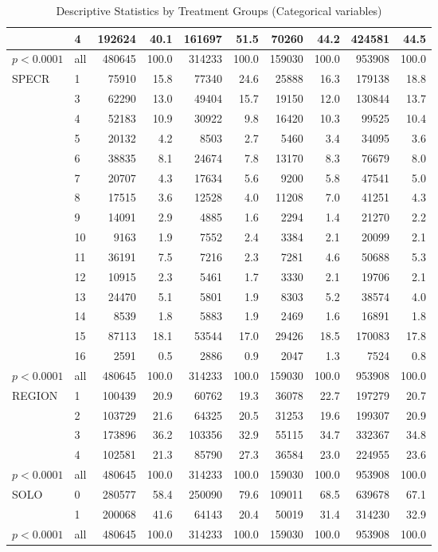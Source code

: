 \begin{table}[ht]
{\begin{tabular}{ll|rr|rr|rr|rr}
   & 4 & 192624 & 40.1 & 161697 & 51.5 & 70260 & 44.2 & 424581 & 44.5 \\ 
   \hline
$p< 0.0001$ & all & 480645 & 100.0 & 314233 & 100.0 & 159030 & 100.0 & 953908 & 100.0 \\ 
   \hline
\hline
SPECR & 1 & 75910 & 15.8 & 77340 & 24.6 & 25888 & 16.3 & 179138 & 18.8 \\ 
   & 3 & 62290 & 13.0 & 49404 & 15.7 & 19150 & 12.0 & 130844 & 13.7 \\ 
   & 4 & 52183 & 10.9 & 30922 & 9.8 & 16420 & 10.3 & 99525 & 10.4 \\ 
   & 5 & 20132 & 4.2 & 8503 & 2.7 & 5460 & 3.4 & 34095 & 3.6 \\ 
   & 6 & 38835 & 8.1 & 24674 & 7.8 & 13170 & 8.3 & 76679 & 8.0 \\ 
   & 7 & 20707 & 4.3 & 17634 & 5.6 & 9200 & 5.8 & 47541 & 5.0 \\ 
   & 8 & 17515 & 3.6 & 12528 & 4.0 & 11208 & 7.0 & 41251 & 4.3 \\ 
   & 9 & 14091 & 2.9 & 4885 & 1.6 & 2294 & 1.4 & 21270 & 2.2 \\ 
   & 10 & 9163 & 1.9 & 7552 & 2.4 & 3384 & 2.1 & 20099 & 2.1 \\ 
   & 11 & 36191 & 7.5 & 7216 & 2.3 & 7281 & 4.6 & 50688 & 5.3 \\ 
   & 12 & 10915 & 2.3 & 5461 & 1.7 & 3330 & 2.1 & 19706 & 2.1 \\ 
   & 13 & 24470 & 5.1 & 5801 & 1.9 & 8303 & 5.2 & 38574 & 4.0 \\ 
   & 14 & 8539 & 1.8 & 5883 & 1.9 & 2469 & 1.6 & 16891 & 1.8 \\ 
   & 15 & 87113 & 18.1 & 53544 & 17.0 & 29426 & 18.5 & 170083 & 17.8 \\ 
   & 16 & 2591 & 0.5 & 2886 & 0.9 & 2047 & 1.3 & 7524 & 0.8 \\ 
   \hline
$p< 0.0001$ & all & 480645 & 100.0 & 314233 & 100.0 & 159030 & 100.0 & 953908 & 100.0 \\ 
   \hline
\hline
REGION & 1 & 100439 & 20.9 & 60762 & 19.3 & 36078 & 22.7 & 197279 & 20.7 \\ 
   & 2 & 103729 & 21.6 & 64325 & 20.5 & 31253 & 19.6 & 199307 & 20.9 \\ 
   & 3 & 173896 & 36.2 & 103356 & 32.9 & 55115 & 34.7 & 332367 & 34.8 \\ 
   & 4 & 102581 & 21.3 & 85790 & 27.3 & 36584 & 23.0 & 224955 & 23.6 \\ 
   \hline
$p< 0.0001$ & all & 480645 & 100.0 & 314233 & 100.0 & 159030 & 100.0 & 953908 & 100.0 \\ 
   \hline
\hline
SOLO & 0 & 280577 & 58.4 & 250090 & 79.6 & 109011 & 68.5 & 639678 & 67.1 \\ 
   & 1 & 200068 & 41.6 & 64143 & 20.4 & 50019 & 31.4 & 314230 & 32.9 \\ 
   \hline
$p< 0.0001$ & all & 480645 & 100.0 & 314233 & 100.0 & 159030 & 100.0 & 953908 & 100.0 \\ 
   \hline
\hline
\end{tabular}
}
\caption{Descriptive Statistics by Treatment Groups (Categorical variables)} 
\label{tab:descriptive.1}
\end{table}
